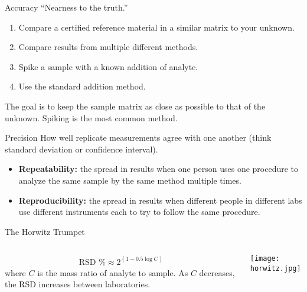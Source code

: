 \documentclass[notes=hide]{beamer}
\begin{document}
\begin{frame}{Accuracy}
	``Nearness to the truth.''

	\begin{enumerate}
		\item Compare a \alert{certified reference material} in a
			similar matrix to your unknown.
		\item Compare results from multiple different methods.
		\item Spike a sample with a known addition of analyte.
		\item Use the \alert{standard addition} method.
	\end{enumerate}

	The goal is to keep the sample matrix as close as possible to that of
	the unknown. Spiking is the most common method.
\end{frame}

\begin{frame}{Precision}
	How well replicate measurements agree with one another (think standard
	deviation or confidence interval).

	\begin{itemize}
		\item \textbf{Repeatability:} the spread in results when
			\alert{one} person uses \alert{one} procedure to analyze
			the \alert{same} sample by the \alert{same} method
			multiple times.
		\item \textbf{Reproducibility:} the spread in results when
			\alert{different} people in \alert{different} labs use
			\alert{different} instruments each to try to follow the
			\alert{same} procedure.
	\end{itemize}
\end{frame}

\begin{frame}{The Horwitz Trumpet}
	\begin{columns}
		\begin{align*}
			\text{RSD \%} \approx 2^{(1-0.5 \log C)}
		\end{align*}
		where $C$ is the mass ratio of analyte to sample. As $C$
		decreases, the RSD increases between laboratories.
		\begin{center}
			\texttt{[image: horwitz.jpg]}
		\end{center}
	\end{columns}
\end{frame}
\end{document}
